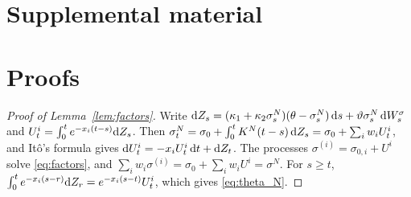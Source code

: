 \section*{Supplemental material}




\appendices

\section{Proofs}\label{app:proofs}

\begin{proof}[Proof of Lemma~\ref{lem:factors}] Write $\mathrm{d} Z_s=(\kappa_1+\kappa_2\sigma^N_s)(\theta-\sigma^N_s)\,\mathrm{d} s+\vartheta\sigma^N_s\,\mathrm{d} W^\sigma_s$ and $U^{i}_t=\int_0^te^{-x_i(t-s)}\mathrm{d} Z_s$. Then $\sigma^N_t=\sigma_0+\int_0^tK^N(t-s)\,\mathrm{d} Z_s=\sigma_0+\sum_iw_iU^i_t$, and It\^o's formula gives $\mathrm{d} U^i_t=-x_iU^i_t\,\mathrm{d} t+\mathrm{d} Z_t$. The processes $\sigma^{(i)}=\sigma_{0,i}+U^i$ solve \eqref{eq:factors}, and $\sum_iw_i\sigma^{(i)}=\sigma_0+\sum_iw_iU^i=\sigma^N$. For $s\ge t$, $\int_0^te^{-x_i(s-r)}\mathrm{d} Z_r=e^{-x_i(s-t)}U^i_t$, which gives \eqref{eq:theta_N}.
\end{proof}

